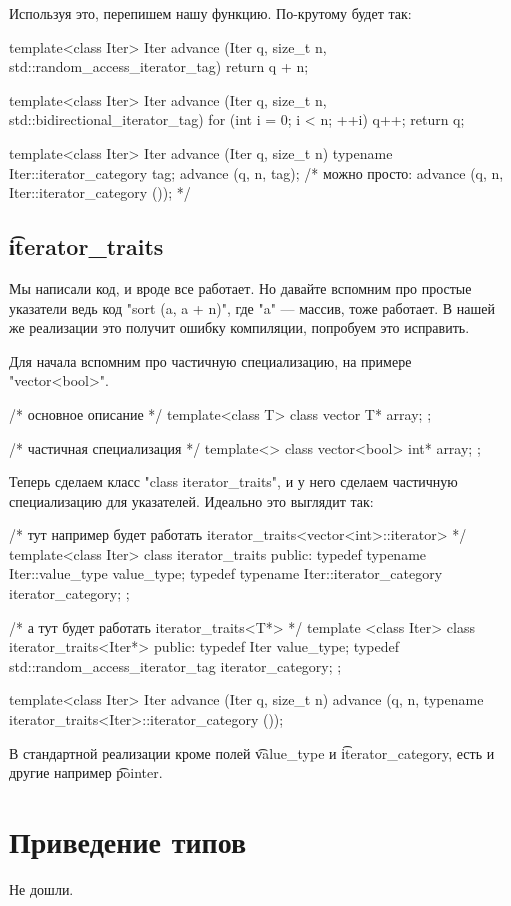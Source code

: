 Используя это, перепишем нашу функцию.
По-крутому будет так:
\begin{cppcode}
template<class Iter>
Iter advance (Iter q, size_t n, std::random_access_iterator_tag) {
	return q + n;
}

template<class Iter>
Iter advance (Iter q, size_t n, std::bidirectional_iterator_tag) {
	for (int i = 0; i < n; ++i)
		q++;
	return q;
} 

template<class Iter>
Iter advance (Iter q, size_t n) {
	typename Iter::iterator_category tag;
	advance (q, n, tag);
	/* можно просто: advance (q, n, Iter::iterator_category ()); */
}
\end{cppcode}

\subsection{\t{iterator\_traits}}
Мы написали код, и вроде все работает. 
Но давайте вспомним про простые указатели ведь код \cpp"sort (a, a + n)", где \cpp"a" --- массив, тоже работает. 
В нашей же реализации это получит ошибку компиляции, попробуем это исправить.

Для начала вспомним про частичную специализацию, на примере \cpp"vector<bool>".
\begin{cppcode}
/* основное описание */
template<class T>
class vector {
	T* array;
};

/* частичная специализация */
template<>
class vector<bool> {
	int* array;
};
\end{cppcode}



Теперь сделаем класс \cpp"class iterator_traits", и у него сделаем частичную специализацию для указателей.
Идеально это выглядит так:
\begin{cppcode}
/* тут например будет работать iterator_traits<vector<int>::iterator> */
template<class Iter>
class iterator_traits {
public:
	typedef typename Iter::value_type value_type;
	typedef typename Iter::iterator_category iterator_category;
};

/* а тут будет работать iterator_traits<T*> */
template <class Iter> 
class iterator_traits<Iter*> {
public:
	typedef Iter value_type;
	typedef std::random_access_iterator_tag iterator_category;
};

template<class Iter>
Iter advance (Iter q, size_t n) {
	advance (q, n, typename iterator_traits<Iter>::iterator_category ());
}
\end{cppcode}
В стандартной реализации кроме полей \t{value\_type} и \t{iterator\_category}, есть и другие например \t{pointer}.

\section{Приведение типов}
Не дошли. 